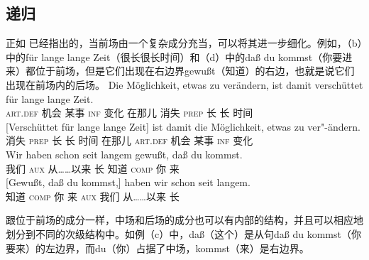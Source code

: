 \subsection{递归}
\label{sec-topo-rekursion}
%
正如 \citet[]{Reis80a}已经指出的，当前场由一个复杂成分充当，可以将其进一步细化。例如，（b）中的für lange lange Zeit（很长很长时间）和（d）中的daß du kommst（你要进来）都位于前场，但是它们出现在右边界gewußt（知道）的右边，也就是说它们出现在前场内的后场。
\eal
\label{Beispiel-topologisch-komplexes-Vorfeld}
\ex
\gll Die Möglichkeit, etwas zu verändern, ist damit verschüttet für lange lange Zeit.\\
	 \textsc{art}.\textsc{def} 机会 某事 \textsc{inf} 变化 \passiveprs{} 在那儿 消失 \textsc{prep} 长 长 时间\\
\ex 
\gll {}[Verschüttet für lange lange Zeit] ist damit die Möglichkeit,      etwas zu ver"-ändern.\\
      \spacebr{}消失 \textsc{prep} 长 长 时间 \passiveprs{} 在那儿 \textsc{art}.\textsc{def} 机会  某事 \textsc{inf} 变化\\
\ex 
\gll Wir haben        schon       seit          langem gewußt, daß du kommst.\\
     我们 \textsc{aux} \particle{} 从……以来 长     知道     \textsc{comp} 你 来\\
\ex 
\gll {}[Gewußt, daß du kommst,] haben wir schon seit langem.\\
	 \spacebr{}知道 \textsc{comp} 你 来 \textsc{aux} 我们 \particle{} 从……以来 长\\
\zl


\noindent
跟位于前场的成分一样，中场和后场的成分也可以有内部的结构，并且可以相应地划分到不同的次级结构中。如例（c）中，daß（这个）是从句daß du kommst（你要来）的左边界，而du（你）占据了中场，kommst（来）是右边界。


